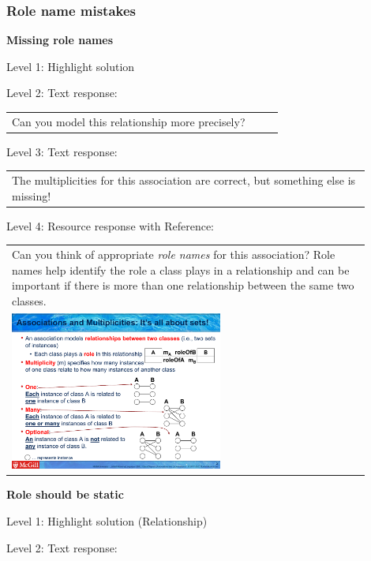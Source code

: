 \subsubsection{Role name mistakes}

\noindent \textbf{Missing role names} \medskip

\noindent Level 1: Highlight solution  \medskip

\noindent Level 2: Text response: \medskip

\begin{tabular}{|p{0.9\linewidth}}
Can you model this relationship more precisely?
\end{tabular} \medskip

\noindent Level 3: Text response: \medskip

\begin{tabular}{|p{0.9\linewidth}}
The multiplicities for this association are correct, but something else is missing!
\end{tabular} \medskip

\noindent Level 4: Resource response with Reference: \medskip

\begin{tabular}{|p{0.9\linewidth}}
Can you think of appropriate \textit{role names}
for this association? Role names help identify the role a class plays in a
relationship and can be important if there is more than one relationship
between the same two classes.

\\
\includegraphics[width=0.6\textwidth]{images/role_name.png}

\end{tabular} \medskip


\noindent \textbf{Role should be static} \medskip

\noindent Level 1: Highlight solution (Relationship) \medskip

\noindent Level 2: Text response: \medskip


